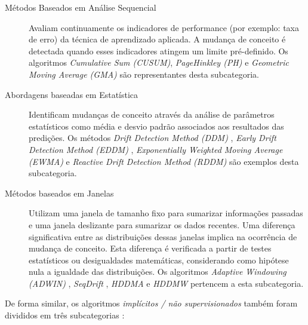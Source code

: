 \documentclass[msc, classic, a4paper]{ufbathesis}
\begin{document}
\begin{description}
    \item[Métodos Baseados em Análise Sequencial] Avaliam continuamente os indicadores de performance (por exemplo: taxa de erro) da técnica de aprendizado aplicada.
    A mudança de conceito é detectada quando esses indicadores atingem um limite pré-definido.
    Os algoritmos \textit{Cumulative Sum (CUSUM)}, \textit{PageHinkley (PH)} \cite{Page:CUSUM:PageHinkley:1954} e \textit{Geometric Moving Average (GMA)} \cite{Roberts:2000:CCT:338441.338464}
    são representantes desta subcategoria.

    \item[Abordagens baseadas em Estatística] Identificam mudanças de conceito através da análise de parâmetros estatísticos como média e desvio padrão associados aos resultados das predições.
    Os métodos \textit{Drift Detection Method (DDM)} \cite{GamaMCR04},
    \textit{Early Drift Detection Method (EDDM)} \cite{EDDM},
    \textit{Exponentially Weighted Moving Average (EWMA)} \cite{Ross:2012:EWM:2076039.2076307} e
    \textit{Reactive Drift Detection Method (RDDM)} \cite{Barros:RDDM:2017} são exemplos desta subcategoria.

    \item[Métodos baseados em Janelas] Utilizam uma janela de tamanho fixo para sumarizar informações passadas e uma janela deslizante para sumarizar os dados recentes.
    Uma diferença significativa entre as distribuições dessas janelas implica na ocorrência de mudança de conceito.
    Esta diferença é verificada a partir de testes estatísticos ou desigualdades matemáticas, considerando como hipótese nula a igualdade das distribuições.
    Os algoritmos
    \textit{Adaptive Windowing (ADWIN)} \cite{BifetG07},
    \textit{SeqDrift} \cite{PearsSK14:SeqDrift:2014},
    \textit{HDDMA} e \textit{HDDMW} \cite{BlancoCRBDM15:HDDMA:HDDMW:2015}
    pertencem a esta subcategoria.
\end{description}

De forma similar, os algoritmos \textit{implícitos / não supervisionados} também foram divididos em três subcategorias \cite{GONCALVES20148144}:
\end{document}
